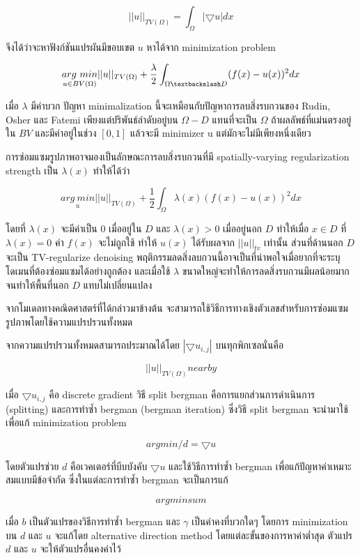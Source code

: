 \documentclass[hidelinks,a4paper,14pt]{article}
\numberwithin{equation}{section}							%
\begin{document}
{	$$ ||u||_{TV(\Omega)} = \int_{\Omega} | \bigtriangledown u | dx$$
	
	จึงได้ว่าจะหาฟังก์ชันแปรผันมีขอบเขต $u$ หาได้จาก minimization problem
	
	$$ \underset{u \in BV(\Omega)}{arg \ min} ||u||_{TV(\Omega)} + \frac{\lambda}{2} \int_{\Omega \textbackslash D} (f(x) - u(x))^2 dx$$
	
	เมื่อ $\lambda$ มีค่าบวก ปัญหา minimalization นี้จะเหมือนกับปัญหาการลบสิ่งรบกวนของ Rudin, Osher และ Fatemi เพียงแต่ปริพันธ์ลำดับอยู่บน $\Omega-D$  แทนที่จะเป็น $\Omega$ ถ้าผลลัพธ์ที่แม่นตรงอยู่ใน $BV$ และมีค่าอยู่ในช่วง $[0,1]$ แล้วจะมี minimizer u แต่มักจะไม่มีเพียงหนึ่งเดียว
	
	การซ่อมแซมรูปภาพอาจมองเป็นลักษณะการลบสิ่งรบกวนที่มี spatially-varying regularization strength เป็น $\lambda(x)$ ทำให้ได้ว่า
	
		$$\underset{u}{{arg \ min}} ||u||_{TV(\Omega)} + \frac{1}{2} \int_{\Omega} \lambda(x)(f(x) - u(x))^2 dx$$
		
	โดยที่ $\lambda(x)$ จะมีค่าเป็น $0$ เมื่ออยู่ใน $D$ และ $\lambda(x)>0$ เมื่ออยู่นอก $D$  ทำให้เมื่อ $x \in D$ ที่ $\lambda(x)=0$ ค่า $f(x)$ จะไม่ถูกใช้ ทำให้ $u(x)$ ได้รับผลจาก $||u||_{tv}$ เท่านั้น ส่วนที่ด้านนอก $D$ จะเป็น TV-regularize denoising พฤติกรรมลดสิ่งลบกวนนี้อาจเป็นที่น่าพอใจเมื่อยากที่จะระบุโดเมนที่ต้องซ่อมแซมได้อย่างถูกต้อง และเมื่อใช้ $λ$ ขนาดใหญ่จะทำให้การลดสิ่งรบกวนมีผลน้อยมากจนทำให้พื้นที่นอก $D$  แทบไม่เปลี่ยนแปลง
	
	จากโมเดลทางคณิตศาสตร์ที่ได้กล่าวมาข้างต้น จะสามารถใช้วิธีการทางเชิงตัวเลขสำหรับการซ่อมแซมรูปภาพโดยใช้ความแปรปรวนทั้งหมด
	
	จากความแปรปรวนทั้งหมดสามารถประมาณได้โดย $ |\bigtriangledown u_{i,j} | $ บนทุกพิกเซลนั่นคือ
	
	$$ ||u||_{TV(\Omega)} near by $$
	
	เมื่อ $\bigtriangledown u_{i,j}$  คือ discrete gradient วิธี split bergman คือการแยกส่วนการดำเนินการ (splitting) และการทำซ้ำ bergman (bergman iteration) ซึ่งวิธี split bergman จะนำมาใช้เพื่อแก้ minimization problem

$$ arg min / d = \bigtriangledown u $$

	โดยตัวแปรช่วย $d$  คือเวคเตอร์ที่บีบบังคับ $ \bigtriangledown u$ และใช้วิธีการทำซ้ำ bergman เพื่อแก้ปัญหาค่าเหมาะสมแบบมีข้อจำกัด ซึ่งในแต่ละการทำซ้ำ bergman จะเป็นการแก้
	
	$$ arg min sum $$
	
	เมื่อ $b$  เป็นตัวแปรของวิธีการทำซ้ำ bergman และ $\gamma$ เป็นค่าคงที่บวกใดๆ โดยการ minimization  บน $d$ และ $u$  จะแก้โดย alternative direction method โดยแต่ละขั้นของการหาค่าต่ำสุด ตัวแปร $d$ และ $u$ จะให้ตัวแปรอื่นคงค่าไว้
	
}
\end{document}
